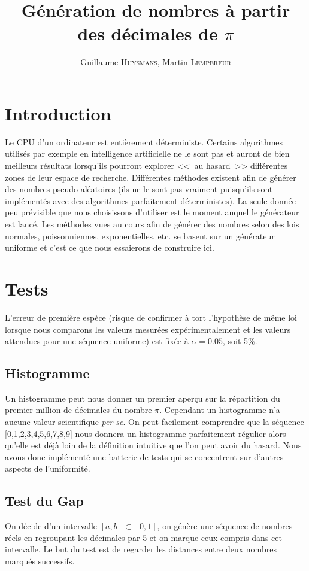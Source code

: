 \documentclass[12pt,a4paper]{article}
\author{Guillaume \textsc{Huysmans}, Martin \textsc{Lempereur}}
\title{Génération de nombres à partir des décimales de $\pi$}
\begin{document}
\maketitle

\section{Introduction}
Le CPU d'un ordinateur est entièrement déterministe. Certains algorithmes
utilisés par exemple en intelligence artificielle ne le sont pas et auront de
bien meilleurs résultats lorsqu'ils pourront explorer <<~au hasard~>> différentes
zones de leur espace de recherche. Différentes méthodes existent afin de générer
des nombres pseudo-aléatoires (ils ne le sont pas vraiment puisqu'ils sont
implémentés avec des algorithmes parfaitement déterministes). La seule donnée
peu prévisible que nous choisissons d'utiliser est le moment auquel le générateur
est lancé.
Les méthodes vues au cours afin de générer des nombres selon des lois normales,
poissonniennes, exponentielles, etc. se basent sur un générateur uniforme et
c'est ce que nous essaierons de construire ici. 

\section{Tests}
L'erreur de première espèce (risque de confirmer à tort l'hypothèse de même loi
lorsque nous comparons les valeurs mesurées expérimentalement et les valeurs
attendues pour une séquence uniforme)
est fixée à $\alpha=0.05$, soit 5\%.

\subsection{Histogramme}
Un histogramme peut nous donner un premier aperçu sur la répartition
du premier million de décimales du nombre $\pi$.
Cependant un histogramme n'a aucune valeur scientifique \textit{per se}.
On peut facilement comprendre que la séquence [0,1,2,3,4,5,6,7,8,9]
nous donnera un histogramme parfaitement régulier alors qu'elle est déjà loin
de la définition intuitive que l'on peut avoir du hasard.
Nous avons donc implémenté une batterie de tests qui se concentrent sur d'autres aspects de l'uniformité.

\subsection{Test du Gap}
On décide d'un intervalle $[a,b] \subset [0,1]$,
on génère une séquence de nombres réels en regroupant les décimales par 5
et on marque ceux compris dans cet intervalle. Le but du test est de regarder les
distances entre deux nombres marqués successifs.
\end{document}
